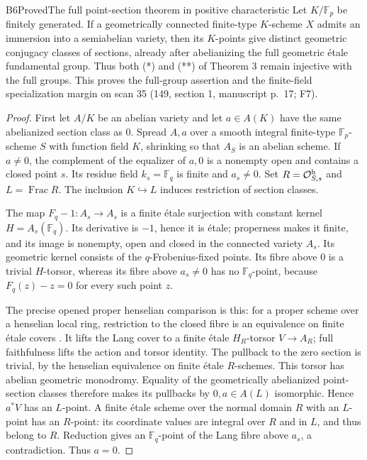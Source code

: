 \begin{result}{B6}{Proved}{The full point-section theorem in positive characteristic}
\label{res:B6}
Let $K/\mathbb F_p$ be finitely generated. If a geometrically connected
finite-type $K$-scheme $X$ admits an immersion into a semiabelian variety,
then its $K$-points give distinct geometric conjugacy classes of sections,
already after abelianizing the full geometric \'etale fundamental group.
Thus both (*) and (**) of Theorem 3 remain injective with the full groups.
This proves the full-group assertion and the finite-field specialization
margin on scan 35 (149, section 1, manuscript p.~17; F7).
\end{result}
\begin{proof}
First let $A/K$ be an abelian variety and let $a\in A(K)$ have the same
abelianized section class as $0$. Spread $A,a$ over a smooth integral
finite-type $\mathbb F_p$-scheme $S$ with function field $K$, shrinking
so that $A_S$ is an abelian scheme. If $a\ne0$, the complement of the
equalizer of $a,0$ is a nonempty open and contains a closed point $s$.
Its residue field $k_s=\mathbb F_q$ is finite and $a_s\ne0$. Set
$R=\mathcal O_{S,s}^{\rm h}$ and $L=\operatorname{Frac}R$.
The inclusion $K\hookrightarrow L$ induces restriction of section classes.

The map $F_q-1:A_s\to A_s$ is a finite \'etale surjection with constant
kernel $H=A_s(\mathbb F_q)$. Its derivative is $-1$, hence it is \'etale;
properness makes it finite, and its image is nonempty, open and closed
in the connected variety $A_s$. Its geometric kernel consists of the
$q$-Frobenius-fixed points. Its fibre above $0$ is a trivial $H$-torsor,
whereas its fibre above $a_s\ne0$ has no $\mathbb F_q$-point, because
$F_q(z)-z=0$ for every such point $z$.

The precise opened proper henselian comparison is this: for a proper
scheme over a henselian local ring, restriction to the closed fibre is
an equivalence on finite \'etale covers
\cite[Lemma 58.9.1, Tag 0A48]{AB_Stacks}.
It lifts the Lang cover to a finite \'etale $H_R$-torsor $V\to A_R$;
full faithfulness lifts the action and torsor identity. The pullback to
the zero section is trivial, by the henselian equivalence on finite
\'etale $R$-schemes\cite[Lemma 58.8.2, Tag 09ZS]{AB_Stacks}.
This torsor has abelian geometric monodromy. Equality of the
geometrically abelianized point-section classes therefore makes its
pullbacks by $0,a\in A(L)$ isomorphic. Hence $a^*V$ has an $L$-point.
A finite \'etale scheme over the normal domain $R$ with an $L$-point
has an $R$-point: its coordinate values are integral over $R$ and in
$L$, and thus belong to $R$. Reduction gives an $\mathbb F_q$-point
of the Lang fibre above $a_s$, a contradiction. Thus $a=0$.


\end{proof}
